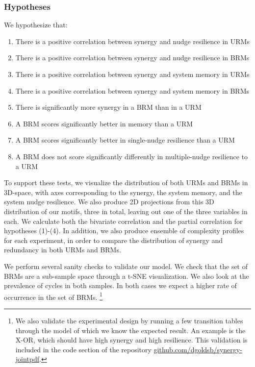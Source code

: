 \documentclass[../main.tex]{subfiles}
\begin{document}
\subsubsection{Hypotheses}

We hypothesize that:

\begin{enumerate}
\itemsep0em
\item There is a positive correlation between synergy and nudge resilience in URMs
\item There is a positive correlation between synergy and nudge resilience in BRMs
\item There is a positive correlation between synergy and system memory in URMs
\item There is a positive correlation between synergy and system memory in BRMs
\item There is significantly more synergy in a BRM than in a URM
\item A BRM scores significantly better in memory than a URM
\item A BRM scores significantly better in single-nudge resilience than a URM
\item A BRM does not score significantly differently in multiple-nudge resilience to a URM
\end{enumerate}

To support these tests, we visualize the distribution of both URMs and BRMs in 3D-space, with axes corresponding to the synergy, the system memory, and the system nudge resilience.
We also produce 2D projections from this 3D distribution of our motifs, three in total, leaving out one of the three variables in each.
We calculate both the bivariate correlation and the partial correlation for hypotheses (1)-(4).
In addition, we also produce ensemble of complexity profiles for each experiment, in order to compare the distribution of synergy and redundancy in both URMs and BRMs.

We perform several sanity checks to validate our model.
We check that the set of BRMs are a sub-sample space through a t-SNE visualization.
We also look at the prevalence of cycles in both samples.
In both cases we expect a higher rate of occurrence in the set of BRMs.
\footnote{We also validate the experimental design by running a few transition tables through the model of which we know the expected result. An example is the X-OR, which should have high synergy and high resilience. This validation is included in the code section of the repository \url{github.com/dgoldsb/synergy-jointpdf}.}
\end{document}
